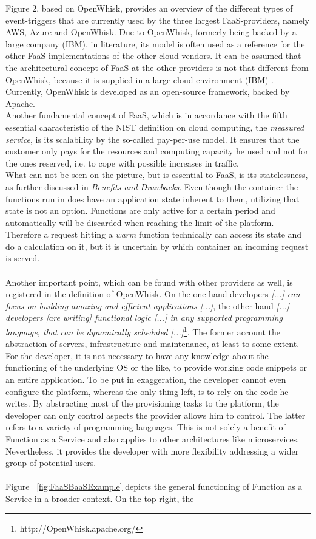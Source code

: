 \documentclass[a4paper,11pt, pagesize]{scrartcl}
\begin{document}
\begin{spacing}{1.2}
Figure 2, based on OpenWhisk, provides an overview of the different types of event-triggers that are currently used by the three largest FaaS-providers, namely AWS, Azure and OpenWhisk. Due to OpenWhisk, formerly being backed by a large company (IBM), in literature, its model is often used as a reference for the other FaaS implementations of the other cloud vendors. It can be assumed that the architectural concept of FaaS at the other providers is not that different from OpenWhisk, because it is supplied in a large cloud environment (IBM) \cite{van2019spec}. Currently, OpenWhisk is developed as an open-source framework, backed by Apache. \\ Another fundamental concept of FaaS, which is in accordance with the fifth essential characteristic of the NIST definition on cloud computing, the \textit{measured service}, is its scalability by the so-called pay-per-use model. It ensures that the customer only pays for the resources and computing capacity he used and not for the ones reserved, i.e. to cope with possible increases in traffic.\\ What can not be seen on the picture, but is essential to FaaS, is its statelessness, as further discussed in \textit{Benefits and Drawbacks}. Even though the container the functions run in does have an application state inherent to them, utilizing that state is not an option. Functions are only active for a certain period and automatically will be discarded when reaching the limit of the platform. Therefore a request hitting a \textit{warm} function technically can access its state and do a calculation on it, but it is uncertain by which container an incoming request is served.\\\\ Another important point, which can be found with other providers as well, is registered in the definition of OpenWhisk. On the one hand developers \glqq \textit{[...] can focus on building amazing and efficient applications [...]}\grqq{}, the other hand \glqq \textit{[...] developers [are writing] functional logic [...] in any supported programming language, that can be dynamically scheduled [...]}\grqq{}\footnote{http://OpenWhisk.apache.org/}. The former account the abstraction of servers, infrastructure and maintenance, at least to some extent. For the developer, it is not necessary to have any knowledge about the functioning of the underlying OS or the like, to provide working code snippets or an entire application. To be put in exaggeration, the developer cannot even configure the platform, whereas the only thing left, is to rely on the code he writes. By abstracting most of the provisioning tasks to the platform, the developer can only control aspects the provider allows him to control. The latter refers to a variety of programming languages. This is not solely a benefit of Function as a Service and also applies to other architectures like microservices. Nevertheless, it provides the developer with more flexibility addressing a wider group of potential users.\\\\ Figure ~\ref{fig:FaaSBaaSExample} depicts the general functioning of Function as a Service in a broader context. On the top right, the 
\end{spacing}
\end{document}
